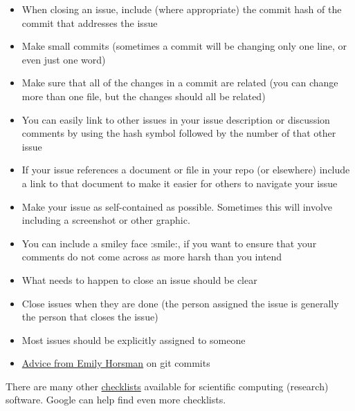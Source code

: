 \documentclass[12pt]{article}
\begin{document}
\begin{itemize}
\item When closing an issue, include (where appropriate) the commit hash of the
  commit that addresses the issue
\item Make small commits (sometimes a commit will be changing only one line, or
  even just one word)
\item Make sure that all of the changes in a commit are related (you can change
  more than one file, but the changes should all be related)
\item You can easily link to other issues in your issue description or
  discussion comments by using the hash symbol followed by the number
  of that other issue
\item If your issue references a document or file in your repo (or elsewhere)
include a link to that document to make it easier for others to navigate your
issue
\item Make your issue as self-contained as possible.  Sometimes this will
involve including a screenshot or other graphic.
\item You can include a smiley face :smile:, if you want to ensure that your
  comments do not come across as more harsh than you intend
\item What needs to happen to close an issue should be clear
\item Close issues when they are done (the person assigned the issue is
  generally the person that closes the issue)
\item Most issues should be explicitly assigned to someone
\item 
  \href{https://gitlab.cas.mcmaster.ca/smiths/se2aa4_cs2me3/-/blob/master/FAQ/GitAdvice.txt}
  {Advice from Emily Horsman} on git commits
\end{itemize}

There are many other
\href{https://gitlab.cas.mcmaster.ca/SEforSC/se4sc/-/wikis/Advice-and-Checklists-for-Repos-(including-a-list-of-recommended-artifacts)}{checklists}
available for scientific computing (research) software.  Google can help find
even more checklists.
\end{document}
